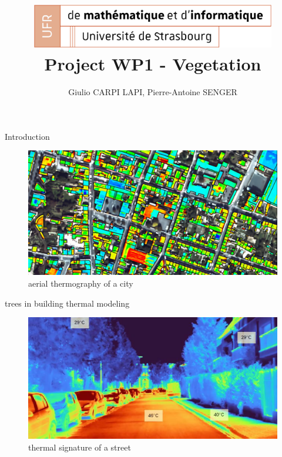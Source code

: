 \documentclass[10pt]{beamer}
\title[WP1]{
  \includegraphics[width=0.8\textwidth]{images/logo_Uni.png}
  Project WP1 - Vegetation}
\author[SCP]{Giulio CARPI LAPI, Pierre-Antoine SENGER}
\begin{document}
\frame{\titlepage}

\begin{frame}{Introduction}

  \begin{figure}[h] %
    \centering
    \includegraphics[width=1\textwidth]{images/thermographie-aerienne.jpg}
    \caption{aerial thermography of a city \cite{thermography}} %
    \label{fig:thermographie} %
  \end{figure}

\end{frame}

\begin{frame}{trees in building thermal modeling}

    \begin{figure}[h] %
      \centering
      \includegraphics[width=1\textwidth]{images/heat_street.png}
      \caption{thermal signature of a street \cite{street thermography}} %
      \label{fig:3d_city_model} %
    \end{figure}

\end{frame}
\end{document}
